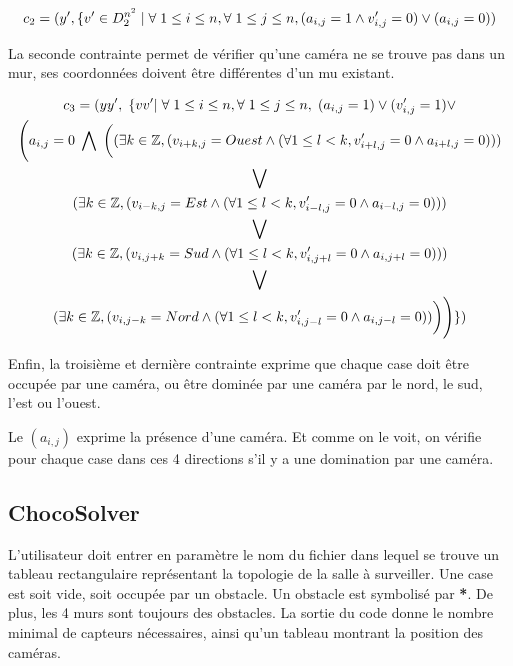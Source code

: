 \documentclass{article}
\begin{document}
  $$c_{2} = ( y', \{ v' \in D_2^{n^2} \mid \forall \hspace{0.1cm} 1\leq i \leq n, \forall \hspace{0.1cm} 1\leq j \leq n, (a_{i,j} = 1 \wedge v'_{i,j} = 0 ) \vee (a_{i,j} = 0))$$  

La seconde contrainte permet de vérifier qu'une caméra ne se trouve pas dans un mur, ses coordonnées doivent être différentes d'un mu existant.

\begin{multline}
    c_{3} = ( yy',\hspace{0.1cm} \{ vv' |\hspace{0.1cm} \forall \hspace{0.1cm} 1\leq i \leq n, \forall \hspace{0.1cm} 1\leq j \leq n, \hspace{0.1cm} (a_{i,j}=1) \vee (v'_{i,j} = 1) \vee \\ \Bigg(a_{i,j} = 0\hspace{0.1cm} \bigwedge \hspace{0.1cm} \bigg(
    (\exists k \in \mathbb{Z} , (v_ {i+k,j} = Ouest \wedge (\forall 1 \leq l < k, v'_{i+l,j}=0
    \wedge a_{i+l,j}=0))) \\
    \bigvee \\
    (\exists k \in \mathbb{Z} , (v_ {i-k,j} = Est \wedge (\forall 1 \leq l < k, v'_{i-l,j}=0
    \wedge a_{i-l,j}=0))) \\
    \bigvee \\
    (\exists k \in \mathbb{Z} , (v_ {i,j+k} = Sud \wedge (\forall 1 \leq l < k, v'_{i,j+l}=0
    \wedge a_{i,j+l}=0))) \\
    \bigvee \\
    (\exists k \in \mathbb{Z} , (v_ {i,j-k} = Nord \wedge (\forall 1 \leq l < k, v'_{i,j-l}=0
    \wedge a_{i,j-l}=0))\bigg)
    \Bigg)\}
    )
  \end{multline}
  
  Enfin, la troisième et dernière contrainte exprime que chaque case doit être occupée par une caméra, ou être dominée par une caméra par le nord, le sud, l'est ou l'ouest.
  
  Le $(a_{i,j}) $ exprime la présence d'une caméra. Et comme on le voit, on vérifie pour chaque case dans ces 4 directions s'il y a une domination par une caméra.

\subsection{ChocoSolver}
L'utilisateur doit entrer en paramètre le nom du fichier dans lequel se trouve un tableau rectangulaire représentant la topologie de la salle à surveiller. 
Une case est soit vide, soit occupée par un obstacle. Un obstacle est symbolisé par \textbf{*}. De plus, les 4 murs sont toujours des obstacles. 
La sortie du code donne le nombre minimal de capteurs nécessaires, ainsi qu'un tableau montrant la position des caméras. \\
\end{document}
